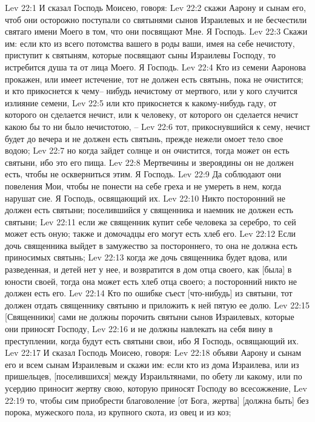 Lev 22:1  И сказал Господь Моисею, говоря:
Lev 22:2  скажи Аарону и сынам его, чтоб они осторожно поступали со святынями сынов Израилевых и не бесчестили святаго имени Моего в том, что они посвящают Мне. Я Господь.
Lev 22:3  Скажи им: если кто из всего потомства вашего в роды ваши, имея на себе нечистоту, приступит к святыням, которые посвящают сыны Израилевы Господу, то истребится душа та от лица Моего. Я Господь.
Lev 22:4  Кто из семени Ааронова прокажен, или имеет истечение, тот не должен есть святынь, пока не очистится; и кто прикоснется к чему-- нибудь нечистому от мертвого, или у кого случится излияние семени,
Lev 22:5  или кто прикоснется к какому-нибудь гаду, от которого он сделается нечист, или к человеку, от которого он сделается нечист какою бы то ни было нечистотою, --
Lev 22:6  тот, прикоснувшийся к сему, нечист будет до вечера и не должен есть святынь, прежде нежели омоет тело свое водою;
Lev 22:7  но когда зайдет солнце и он очистится, тогда может он есть святыни, ибо это его пища.
Lev 22:8  Мертвечины и звероядины он не должен есть, чтобы не оскверниться этим. Я Господь.
Lev 22:9  Да соблюдают они повеления Мои, чтобы не понести на себе греха и не умереть в нем, когда нарушат сие. Я Господь, освящающий их.
Lev 22:10  Никто посторонний не должен есть святыни; поселившийся у священника и наемник не должен есть святыни;
Lev 22:11  если же священник купит себе человека за серебро, то сей может есть оную; также и домочадцы его могут есть хлеб его.
Lev 22:12  Если дочь священника выйдет в замужество за постороннего, то она не должна есть приносимых святынь;
Lev 22:13  когда же дочь священника будет вдова, или разведенная, и детей нет у нее, и возвратится в дом отца своего, как [была] в юности своей, тогда она может есть хлеб отца своего; а посторонний никто не должен есть его.
Lev 22:14  Кто по ошибке съест [что-нибудь] из святыни, тот должен отдать священнику святыню и приложить к ней пятую ее долю.
Lev 22:15  [Священники] сами не должны порочить святыни сынов Израилевых, которые они приносят Господу,
Lev 22:16  и не должны навлекать на себя вину в преступлении, когда будут есть святыни свои, ибо Я Господь, освящающий их.
Lev 22:17  И сказал Господь Моисею, говоря:
Lev 22:18  объяви Аарону и сынам его и всем сынам Израилевым и скажи им: если кто из дома Израилева, или из пришельцев, [поселившихся] между Израильтянами, по обету ли какому, или по усердию приносит жертву свою, которую приносят Господу во всесожжение,
Lev 22:19  то, чтобы сим приобрести благоволение [от Бога, жертва] [должна быть] без порока, мужеского пола, из крупного скота, из овец и из коз;
